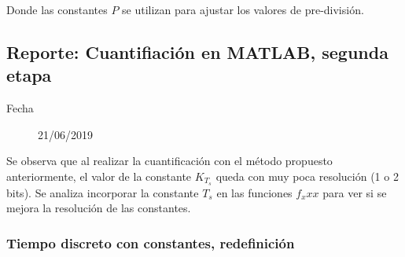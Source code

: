 \documentclass{article}
\begin{document}
        Donde las constantes $P$ se utilizan para ajustar los valores de pre-división.
        


        \subsection{Reporte: Cuantifiación en MATLAB, segunda etapa}
            \begin{description}
            	\item[Fecha]  21/06/2019 
            \end{description}
        
            Se observa que al realizar la cuantificación con el método propuesto anteriormente, el valor de la constante $ K_{T_s} $ queda con muy poca resolución (1 o 2 bits). Se analiza incorporar la constante $T_s$ en las funciones $f_xxx$ para ver si se mejora la resolución de las constantes.


            \subsubsection{Tiempo discreto con constantes, redefinición}
                

		
	
	
	
	
	
	
	
\end{document}
